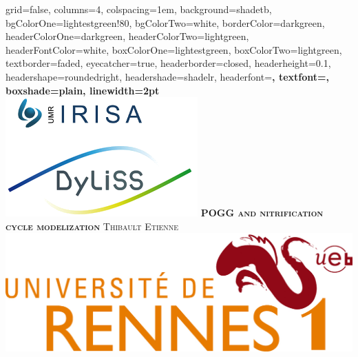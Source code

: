 \documentclass[portrait,final,a0paper,fontscale=0.290]{baposter}
\begin{document}


\begin{poster}%
  {
  grid=false,
  columns=4,
  colspacing=1em,
  background=shadetb,
  bgColorOne=lightestgreen!80,
  bgColorTwo=white,
  borderColor=darkgreen,
  headerColorOne=darkgreen,
  headerColorTwo=lightgreen,
  headerFontColor=white,
  boxColorOne=lightestgreen,
  boxColorTwo=lightgreen,
  textborder=faded,
  eyecatcher=true,
  headerborder=closed,
  headerheight=0.1\textheight,
  headershape=roundedright,
  headershade=shadelr,
  headerfont=\Large\bf\textsc, %
  textfont={\setlength{\parindent}{1.5em}},
  boxshade=plain,
  linewidth=2pt
  }
  {
      \includegraphics[scale=0.5]{logo_irisa_dyliss.png}
  }
  {\bf\textsc{POGG and nitrification cycle modelization}\vspace{0.5em}}
  {\textsc{Thibault Etienne}}
  {
    \includegraphics[scale=0.5]{logo_UR1_UEB.png}
  }


\end{poster}
\end{document}
